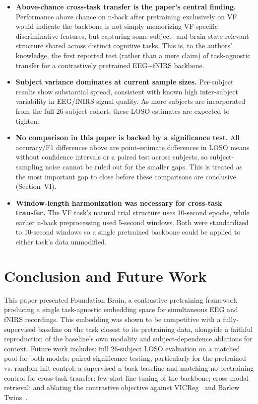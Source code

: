 \documentclass[journal]{IEEEtran}
\begin{document}
\begin{itemize}
\item \textbf{Above-chance cross-task transfer is the paper's central finding.} Performance above chance on n-back after pretraining exclusively on VF would indicate the backbone is not simply memorizing VF-specific discriminative features, but capturing some subject- and brain-state-relevant structure shared across distinct cognitive tasks. This is, to the authors' knowledge, the first reported test (rather than a mere claim) of task-agnostic transfer for a contrastively pretrained EEG+fNIRS backbone.

\item \textbf{Subject variance dominates at current sample sizes.} Per-subject results show substantial spread, consistent with known high inter-subject variability in EEG/fNIRS signal quality. As more subjects are incorporated from the full 26-subject cohort, these LOSO estimates are expected to tighten.

\item \textbf{No comparison in this paper is backed by a significance test.} All accuracy/F1 differences above are point-estimate differences in LOSO means without confidence intervals or a paired test across subjects, so subject-sampling noise cannot be ruled out for the smaller gaps. This is treated as the most important gap to close before these comparisons are conclusive (Section~VI).

\item \textbf{Window-length harmonization was necessary for cross-task transfer.} The VF task's natural trial structure uses 10-second epochs, while earlier n-back preprocessing used 5-second windows. Both were standardized to 10-second windows so a single pretrained backbone could be applied to either task's data unmodified.
\end{itemize}

\section{Conclusion and Future Work}
This paper presented Foundation Brain, a contrastive pretraining framework producing a single task-agnostic embedding space for simultaneous EEG and fNIRS recordings. This embedding was shown to be competitive with a fully-supervised baseline on the task closest to its pretraining data, alongside a faithful reproduction of the baseline's own modality and subject-dependence ablations for context. Future work includes: full 26-subject LOSO evaluation on a matched pool for both models; paired significance testing, particularly for the pretrained-vs.-random-init control; a supervised n-back baseline and matching no-pretraining control for cross-task transfer; few-shot fine-tuning of the backbone; cross-modal retrieval; and ablating the contrastive objective against VICReg~\cite{bardes2022} and Barlow Twins~\cite{zbontar2021}.
\end{document}
